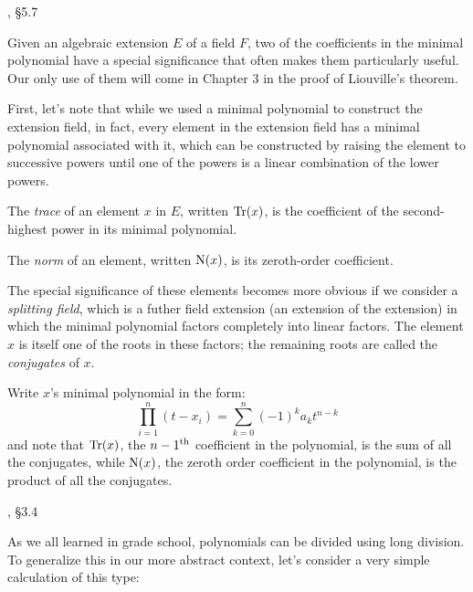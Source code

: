 \begin{comment}
Again, like with the quotient field, I tend to be a bit loose with the
notation.  Something like the Gaussian integers, which I wrote as
${\bf Z}[i]; i^2=-1$, really should be expressed as equivalence
classes modulo the polynomial $i^2+1$, i.e.  ${\bf Z}[i]/(i^2+1)$.
\end{comment}


, \S5.7

Given an algebraic extension $E$ of a field $F$, two of the
coefficients in the minimal polynomial have a special significance
that often makes them particularly useful.  Our only use of them will
come in Chapter 3 in the proof of Liouville's theorem.

First, let's note that while we used a minimal polynomial to
construct the extension field,
in fact, every element in the extension field
has a minimal polynomial associated with it,
which can be constructed by raising the element to successive
powers until one of the powers is a linear combination
of the lower powers.

The {\it trace} of an
element $x$ in $E$, written ${\rm Tr}(x)$, is the coefficient
of the second-highest power in its minimal polynomial.
\enddefinition

The {\it norm} of an element, written ${\rm N}(x)$, is its zeroth-order coefficient.
\enddefinition

The special significance of these elements becomes more obvious if we
consider a {\it splitting field}, which is a futher field extension
(an extension of the extension) in which the minimal polynomial
factors completely into linear factors.  The element $x$ is
itself one of the roots in these factors; the remaining
roots are called the {\it conjugates} of $x$.

Write $x$'s minimal polynomial in the form:
$$\prod_{i=1}^n \left( t - x_i \right) = \sum_{k=0}^n (-1)^{k} a_k t^{n-k}$$
and note that ${\rm Tr}(x)$, the $n-1^{\rm th}$ coefficient in the polynomial,
is the sum of all the conjugates, while ${\rm N}(x)$, the zeroth order
coefficient in the polynomial, is the product of all the conjugates.

\vfill\eject

, \S3.4

As we all learned in grade school, polynomials can be divided
using long division.  To generalize this in our more abstract
context, let's consider a very simple calculation of this type:

